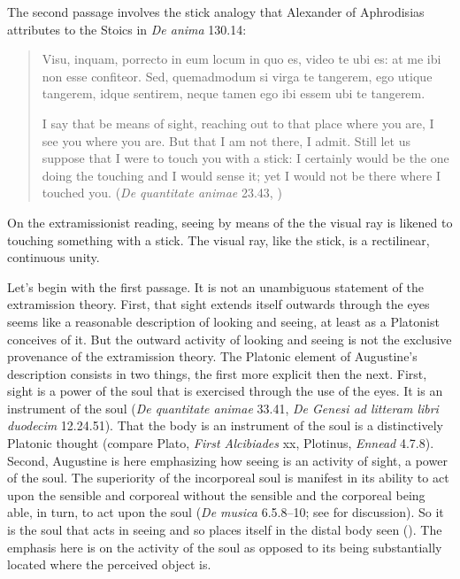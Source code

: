 \documentclass[12pt]{article}
\begin{document}
The second passage involves the stick analogy that Alexander of Aphrodisias attributes to the Stoics in \emph{De anima} 130.14:
\begin{quote}
	Visu, inquam, porrecto in eum locum in quo es, video te ubi es: at me ibi non esse confiteor. Sed, quemadmodum si virga te tangerem, ego utique tangerem, idque sentirem, neque tamen ego ibi essem ubi te tangerem. 
	
	I say that be means of sight, reaching out to that place where you are, I see you where you are. But that I am not there, I admit. Still let us suppose that I were to touch you with a stick: I certainly would be the one doing the touching and I would sense it; yet I would not be there where I touched you. (\emph{De quantitate animae} 23.43, \citealt[66]{Colleran:1949ys}) 
\end{quote}
On the extramissionist reading, seeing by means of the the visual ray is likened to touching something with a stick. The visual ray, like the stick, is a rectilinear, continuous unity.


Let's begin with the first passage. It is not an unambiguous statement of the extramission theory. First, that sight extends itself outwards through the eyes seems like a reasonable description of looking and seeing, at least as a Platonist conceives of it. But the outward activity of looking and seeing is not the exclusive provenance of the extramission theory. The Platonic element of Augustine's description consists in two things, the first more explicit then the next.  First, sight is a power of the soul that is exercised through the use of the eyes. It is an instrument of the soul (\emph{De quantitate animae} 33.41, \emph{De Genesi ad litteram libri duodecim} 12.24.51). That the body is an instrument of the soul is a distinctively Platonic thought (compare Plato, \emph{First Alcibiades} xx, Plotinus, \emph{Ennead} 4.7.8). Second, Augustine is here emphasizing how seeing is an activity of sight, a power of the soul. The superiority of the incorporeal soul is manifest in its ability to act upon the sensible and corporeal without the sensible and the corporeal being able, in turn, to act upon the soul (\emph{De musica} 6.5.8--10; see \citealt{Silva:2014bh} for discussion). So it is the soul that acts in seeing and so places itself in the distal body seen (\citealt[205, n.55]{Colleran:1949ys}). The emphasis here is on the activity of the soul as opposed to its being substantially located where the perceived object is.
\end{document}
